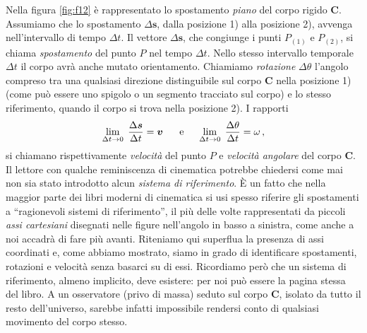 \noindent Nella figura \ref{fig:f12} \`e rappresentato lo spostamento {\em piano} del corpo rigido
{\bf C}. Assumiamo che lo spostamento $\Delta{\bm{s}}$,
dalla posizione 1) alla posizione 2), avvenga 
nell'intervallo di tempo $\Delta t$.
Il vettore $\Delta \bm{s}$, che congiunge i punti $P_{(1)}$ e $P_{(2)}$, si chiama
{\em spostamento}  del punto $P$ nel 
tempo $\Delta t$.
Nello stesso intervallo temporale $\Delta t$ il corpo avr\`a anche mutato orientamento.
Chiamiamo
{\em rotazione}  $\Delta \theta$ l'angolo compreso
tra una qualsiasi direzione distinguibile sul corpo {\bf C} nella posizione
1) (come pu\`o
essere uno spigolo o un segmento tracciato sul corpo) e lo stesso riferimento,
quando il corpo si trova nella posizione 2).
I rapporti
\begin{equation}
	\lim_{\Delta t \to 0}\;{\Delta {\bm{s}}\over {\Delta t}} = {\bm{v}}\;\;\;\;\;\; \textrm{e}
	\;\;\;\;\;
	\lim_{\Delta t \to 0}\;{{\Delta \theta }\over {\Delta t}} = {\omega}\,, \label{e12}
\end{equation}	
\noindent si chiamano rispettivamente {\em velocit\`a}
del punto $P$ e {\em velocit\`a angolare}
del corpo {\bf C}.
Il lettore con qualche reminiscenza di cinematica
potrebbe chiedersi come mai
non sia stato introdotto alcun {\em sistema di
riferimento}. 
\`E un fatto che nella maggior parte dei libri moderni di cinematica
si usi spesso riferire gli spostamenti a ``ragionevoli sistemi di riferimento'',
il pi\`u delle volte rappresentati da piccoli {\em assi cartesiani}
disegnati nelle figure nell'angolo in basso a sinistra, come anche a noi accadr\`a di fare pi\`u avanti.
Riteniamo qui superflua la presenza di assi coordinati e, come
abbiamo mostrato, siamo in grado di identificare spostamenti, rotazioni e velocit\`a
senza basarci su di essi.
Ricordiamo per\`o che un sistema di riferimento, almeno implicito, deve
esistere: per noi pu\`o essere la pagina stessa del libro.
A un osservatore (privo di massa) seduto sul corpo {\bf C},  isolato da
tutto il resto dell'universo, sarebbe infatti impossibile rendersi
conto di qualsiasi movimento del corpo stesso.


